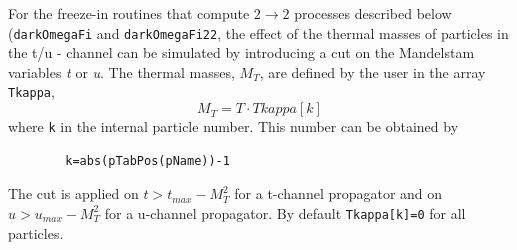 \documentclass[12pt,a4paper]{article}
\begin{document}
 
 For the freeze-in routines that compute $2\rightarrow 2$ processes described below ({\tt darkOmegaFi} and {\tt darkOmegaFi22}, the effect of the thermal masses of particles in the t/u - channel can be simulated by  introducing a cut on the Mandelstam variables {\it t} or {\it u}.
The thermal masses, $M_T$, are defined by the user in the array {\tt Tkappa}, 
\begin{equation}
     M_T = T\cdot Tkappa[k]    
\end{equation}
where  {\tt k} in the  internal particle  number. This number can be  obtained by 
\begin{verbatim}
        k=abs(pTabPos(pName))-1
\end{verbatim}        
The  cut  is applied on 
$ t>  t_{max}- M_T^2 $ for a  t-channel propagator and on $ u> u_{max}- M_T^2$ for a u-channel propagator. By default {\tt Tkappa[k]=0}  for all particles.      \\
\end{document}
